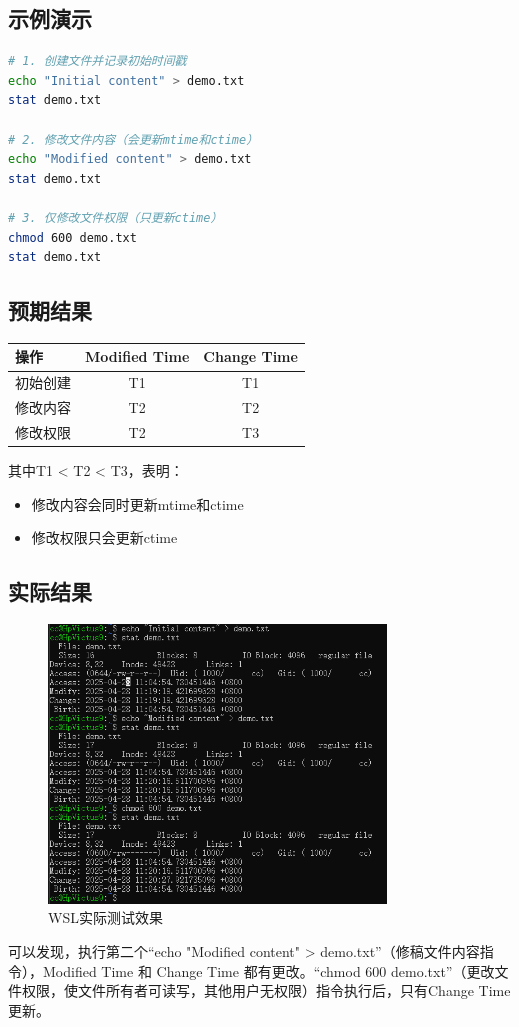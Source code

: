 \documentclass[12pt,hyperref,a4paper,UTF8]{ctexart}
\begin{document}
\subsection{示例演示}
\begin{lstlisting}[language=bash, caption=演示mtime和ctime区别]
# 1. 创建文件并记录初始时间戳
echo "Initial content" > demo.txt
stat demo.txt

# 2. 修改文件内容（会更新mtime和ctime）
echo "Modified content" > demo.txt
stat demo.txt

# 3. 仅修改文件权限（只更新ctime）
chmod 600 demo.txt
stat demo.txt
\end{lstlisting}

\subsection{预期结果}
\begin{center}
\begin{tabular}{|l|c|c|}
\hline
操作 & Modified Time & Change Time \\
\hline
初始创建 & T1 & T1 \\
修改内容 & T2 & T2 \\
修改权限 & T2 & T3 \\
\hline
\end{tabular}
\end{center}

其中T1 < T2 < T3，表明：
\begin{itemize}
    \item 修改内容会同时更新mtime和ctime
    \item 修改权限只会更新ctime
\end{itemize}

\subsection{实际结果}

\begin{figure}[H] %
    \centering
    \includegraphics[width=0.8\textwidth]{figures/L2.png} %
    \caption{WSL实际测试效果} %
    \label{fig:example} %
\end{figure}

可以发现，执行第二个“echo "Modified content" > demo.txt”（修稿文件内容指令），Modified Time 和 Change Time
都有更改。“chmod 600 demo.txt”（更改文件权限，使文件所有者可读写，其他用户无权限）指令执行后，只有Change Time更新。
\end{document}

